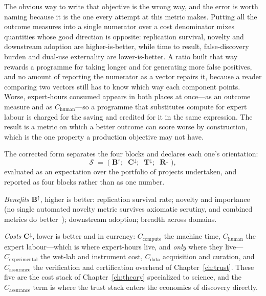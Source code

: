 The obvious way to write that objective is the wrong way, and the error is worth naming because it is the one every attempt at this metric makes. Putting all the outcome measures into a single numerator over a cost denominator mixes quantities whose good direction is opposite: replication survival, novelty and downstream adoption are higher-is-better, while time to result, false-discovery burden and dual-use externality are lower-is-better. A ratio built that way rewards a programme for taking longer and for generating more false positives, and no amount of reporting the numerator as a vector repairs it, because a reader comparing two vectors still has to know which way each component points. Worse, expert-hours consumed appears in both places at once---as an outcome measure and as $C_{\mathrm{human}}$---so a programme that substitutes compute for expert labour is charged for the saving and credited for it in the same expression. The result is a metric on which a better outcome can score worse by construction, which is the one property a production objective may not have.

The corrected form separates the four blocks and declares each one's orientation:
\begin{equation}
\boldsymbol{\mathcal{S}} \;=\; \bigl(\; \mathbf{B}^{\uparrow};\;\; \mathbf{C}^{\downarrow};\;\; \mathbf{T}^{\downarrow};\;\; \mathbf{R}^{\downarrow} \;\bigr),
\label{eq:sci-metric}
\end{equation}
evaluated as an expectation over the portfolio of projects undertaken, and reported as four blocks rather than as one number.

\emph{Benefits} $\mathbf{B}^{\uparrow}$, higher is better: replication survival rate; novelty and importance (no single automated novelty metric survives axiomatic scrutiny, and combined metrics do better~\cite{liu2026novelty}); downstream adoption; breadth across domains.

\emph{Costs} $\mathbf{C}^{\downarrow}$, lower is better and in currency: $C_{\mathrm{compute}}$ the machine time, $C_{\mathrm{human}}$ the expert labour---which is where expert-hours live, and \emph{only} where they live---$C_{\mathrm{experimental}}$ the wet-lab and instrument cost, $C_{\mathrm{data}}$ acquisition and curation, and $C_{\mathrm{assurance}}$ the verification and certification overhead of Chapter~\ref{ch:trust}. These five are the cost stack of Chapter~\ref{ch:theory} specialized to science, and the $C_{\mathrm{assurance}}$ term is where the trust stack enters the economics of discovery directly.

